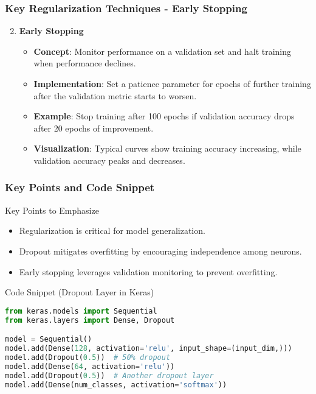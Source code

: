 \documentclass[aspectratio=169]{beamer}
\begin{document}
\begin{frame}[fragile]
    \frametitle{Key Regularization Techniques - Early Stopping}
    \begin{enumerate}
        \setcounter{enumi}{1}
        \item \textbf{Early Stopping}
        \begin{itemize}
            \item \textbf{Concept}: Monitor performance on a validation set and halt training when performance declines.
            \item \textbf{Implementation}: Set a patience parameter for epochs of further training after the validation metric starts to worsen.
            \item \textbf{Example}: Stop training after 100 epochs if validation accuracy drops after 20 epochs of improvement.
            \item \textbf{Visualization}: Typical curves show training accuracy increasing, while validation accuracy peaks and decreases.
        \end{itemize}
    \end{enumerate}
\end{frame}

\begin{frame}[fragile]
    \frametitle{Key Points and Code Snippet}
    \begin{block}{Key Points to Emphasize}
        \begin{itemize}
            \item Regularization is critical for model generalization.
            \item Dropout mitigates overfitting by encouraging independence among neurons.
            \item Early stopping leverages validation monitoring to prevent overfitting.
        \end{itemize}
    \end{block}
    
    \begin{block}{Code Snippet (Dropout Layer in Keras)}
        \begin{lstlisting}[language=Python]
from keras.models import Sequential
from keras.layers import Dense, Dropout

model = Sequential()
model.add(Dense(128, activation='relu', input_shape=(input_dim,)))
model.add(Dropout(0.5))  # 50% dropout
model.add(Dense(64, activation='relu'))
model.add(Dropout(0.5))  # Another dropout layer
model.add(Dense(num_classes, activation='softmax'))
        \end{lstlisting}
    \end{block}
\end{frame}
\end{document}
